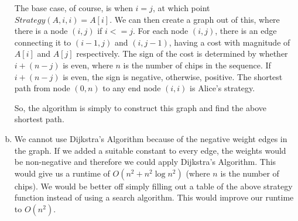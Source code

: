 \documentclass[fleqn]{homework}
\begin{document}
\begin{problem}{5}
\begin{enumerate}[a.]
      The base case, of course, is when $i=j$, at which point
      $Strategy(A,i,i)=A[i]$.  We can then create a graph out of this, where
      there is a node $(i,j)$ if $i <= j$.  For each node $(i,j)$, there is an
      edge connecting it to $(i-1, j)$ and $(i,j-1)$, having a cost with
      magnitude of $A[i]$ and $A[j]$ respectively.  The sign of the cost is
      determined by whether $i + (n-j)$ is even, where $n$ is the number of
      chips in the sequence.  If $i+(n-j)$ is even, the sign is negative,
      otherwise, positive.  The shortest path from node $(0,n)$ to any end node
      $(i,i)$ is Alice's strategy.

      So, the algorithm is simply to construct this graph and find the above
      shortest path.

    \item We cannot use Dijkstra's Algorithm because of the negative weight
      edges in the graph.  If we added a suitable constant to every edge, the
      weights would be non-negative and therefore we could apply Dijkstra's
      Algorithm.  This would give us a runtime of $O(n^2 + n^2 \log{n^2})$
      (where $n$ is the number of chips).  We would be better off simply filling
      out a table of the above strategy function instead of using a search
      algorithm.  This would improve our runtime to $O(n^2)$.
      
    \end{enumerate}
  \end{problem}
\end{document}
